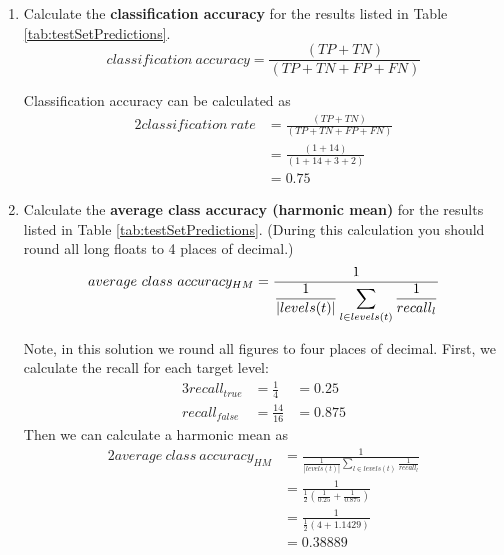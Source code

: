 \documentclass[nosolution]{ditpaper}
\begin{document}
\begin{enumerate}
\begin{enumerate}
\item Calculate the \textbf{classification accuracy} for the results listed in Table \ref{tab:testSetPredictions}.
\begin{equation*}
classification~accuracy = \frac{\left(TP + TN\right)}{\left(TP + TN + FP + FN\right)}
\end{equation*}
\begin{answer}
Classification accuracy can be calculated as
\begin{alignat*}{2}
classification~rate & = \frac{\left(TP + TN\right)}{\left(TP + TN + FP + FN\right)} \\
 & = \frac{\left(1 + 14\right)}{\left(1 + 14 + 3 + 2\right)} \\ 
 & = 0.75
\end{alignat*}
\end{answer}

\item Calculate the \textbf{average class accuracy (harmonic mean)} for the results listed in Table \ref{tab:testSetPredictions}. (During this calculation you should round all long floats to 4 places of decimal.)
\begin{equation*}
average~class~accuracy_{HM} = \displaystyle \frac{1}{\displaystyle \frac{1}{|levels(t)|}\sum_{l \in levels(t)} \frac{1}{recall_l}} \\
\end{equation*}
\begin{answer}
Note, in this solution we round all figures to four places of decimal.
First, we calculate the recall for each target level:
\begin{alignat*}{3}
recall_{\textit{true}} & = \frac{1}{4} & = 0.25 \\
recall_{\textit{false}} & = \frac{14}{16} & = 0.875
\end{alignat*}
Then we can calculate a harmonic mean as
\begin{alignat*}{2}
average~class~accuracy_{HM} & = \displaystyle \frac{1}{\displaystyle \frac{1}{|levels(t)|}\sum_{l \in levels(t)} \frac{1}{recall_l}} \\
& = \displaystyle \frac{1}{\displaystyle \frac{1}{2}\left( \frac{1}{0.25} + \frac{1}{0.875} \right) } \\
& = \displaystyle \frac{1}{\displaystyle \frac{1}{2}\left( 4 + 1.1429 \right) } \\
& = 0.38889
\end{alignat*}
\end{answer}


\end{enumerate}
\end{enumerate}
\end{document}

